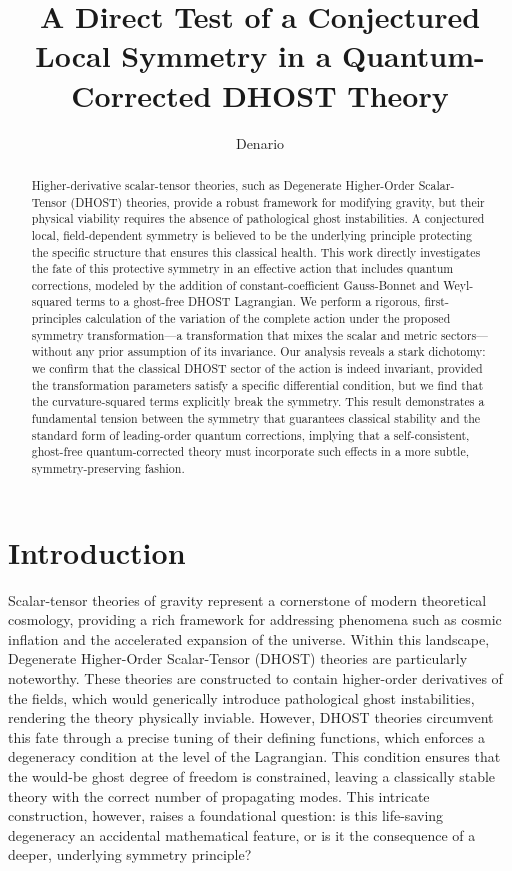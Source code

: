 \documentclass[twocolumn]{aastex631}
\begin{document}
\title{A Direct Test of a Conjectured Local Symmetry in a Quantum-Corrected DHOST Theory}

\author{Denario}

\begin{abstract}
Higher-derivative scalar-tensor theories, such as Degenerate Higher-Order Scalar-Tensor (DHOST) theories, provide a robust framework for modifying gravity, but their physical viability requires the absence of pathological ghost instabilities. A conjectured local, field-dependent symmetry is believed to be the underlying principle protecting the specific structure that ensures this classical health. This work directly investigates the fate of this protective symmetry in an effective action that includes quantum corrections, modeled by the addition of constant-coefficient Gauss-Bonnet and Weyl-squared terms to a ghost-free DHOST Lagrangian. We perform a rigorous, first-principles calculation of the variation of the complete action under the proposed symmetry transformation—a transformation that mixes the scalar and metric sectors—without any prior assumption of its invariance. Our analysis reveals a stark dichotomy: we confirm that the classical DHOST sector of the action is indeed invariant, provided the transformation parameters satisfy a specific differential condition, but we find that the curvature-squared terms explicitly break the symmetry. This result demonstrates a fundamental tension between the symmetry that guarantees classical stability and the standard form of leading-order quantum corrections, implying that a self-consistent, ghost-free quantum-corrected theory must incorporate such effects in a more subtle, symmetry-preserving fashion.
\end{abstract}



\section{Introduction}
\label{sec:intro}
Scalar-tensor theories of gravity represent a cornerstone of modern theoretical cosmology, providing a rich framework for addressing phenomena such as cosmic inflation and the accelerated expansion of the universe. Within this landscape, Degenerate Higher-Order Scalar-Tensor (DHOST) theories are particularly noteworthy. These theories are constructed to contain higher-order derivatives of the fields, which would generically introduce pathological ghost instabilities, rendering the theory physically inviable. However, DHOST theories circumvent this fate through a precise tuning of their defining functions, which enforces a degeneracy condition at the level of the Lagrangian. This condition ensures that the would-be ghost degree of freedom is constrained, leaving a classically stable theory with the correct number of propagating modes. This intricate construction, however, raises a foundational question: is this life-saving degeneracy an accidental mathematical feature, or is it the consequence of a deeper, underlying symmetry principle?
\end{document}

